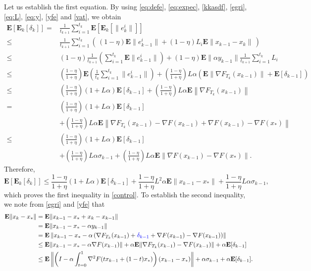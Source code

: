 \documentclass[11pt]{article}
\newcommand{\E}{\mathbf{E}}
\begin{document}
Let us establish the first equation.
By using \eqref{eq:defe}, \eqref{eq:expec}, \eqref{kkasdf},  \eqref{egri}, \eqref{eq:L}, \eqref{eq:y}, \eqref{yfe} and \eqref{vat}, we obtain
\small
\begin{align*}
 \E[\E_k[\delta_k]]  = &\frac{1}{t_{k+1}}\sum_{i=1}^{t_k} \E[\E_k[\|e_k^i\|]] \\
 \leq &  \frac{1}{t_{k+1}}\sum_{i=1}^{t_k} \left(\, (1-\eta)\E\|e_{k-1}^i\| + (1-\eta)L_i \E\|x_{k-1} - x_k\| \, \right)\\
 \leq  &(1-\eta)\frac{1}{t_{k+1}}\left(\sum_{i=1}^{t_k}\E\|e_{k-1}^i\|\right) +   (1-\eta) \E\|\alpha y_{k-1}\| \frac{1}{t_{k+1}}\sum_{i=1}^{t_k}L_i\\
 \leq  &{\left(\frac{1-\eta}{1+\eta}\right)}\E\left(\frac{1}{t_k}\sum_{i=1}^{t_k}\|e_{k-1}^i\|\right) + {\left(\frac{1-\eta}{1+\eta}\right)} L \alpha\left(\E\|\nabla F_{T_k}(x_{k-1})\| + \E[\delta_{k-1}]\right) \\
 \leq  &{\left(\frac{1-\eta}{1+\eta}\right)}\left(1 + L\alpha \right)\E[\delta_{k-1}] + {\left(\frac{1-\eta}{1+\eta}\right)}L\alpha\E\left\|\nabla F_{T_k}(x_{k-1})\right\|\\
  = &{\left(\frac{1-\eta}{1+\eta}\right)}\left(1 + L\alpha \right)\E[\delta_{k-1}] \\
 &+ {\left(\frac{1-\eta}{1+\eta}\right)}L\alpha\E\left\|\nabla F_{T_k}(x_{k-1})-\nabla F(x_{k-1})+\nabla F(x_{k-1})-\nabla F(x_\ast)\right\|\\
  \leq &{\left(\frac{1-\eta}{1+\eta}\right)}\left(1 + L\alpha \right)\E[\delta_{k-1}] \\
 &+ {\left(\frac{1-\eta}{1+\eta}\right)}L\alpha\sigma_{k-1} + {\left(\frac{1-\eta}{1+\eta}\right)}L\alpha\E\|\nabla F(x_{k-1})-\nabla F(x_\ast)\| .
\end{align*}
\normalsize
Therefore,
\begin{equation}\label{eq:row1}
 \E[\E_k[\delta_k]] \leq \frac{1-\eta}{1+\eta}\left(1 + L\alpha \right)\E[\delta_{k-1}]+  \frac{1-\eta}{1+\eta}L^2\alpha\E\|x_{k-1}-x_\ast\| + \frac{1-\eta}{1+\eta}L\alpha\sigma_{k-1} ,
\end{equation}
which proves the first inequality in \eqref{control}. To establish the second inequality, we note from \eqref{egri} and \eqref{yfe} that
 \begin{align*}
   \E\|x_k-x_\ast\| &= \E\|x_{k-1}-x_\ast + x_k-x_{k-1}\|\\
   &= \E\|x_{k-1}-x_\ast -\alpha y_{k-1}\|\\
   &= \E\left\|x_{k-1}-x_\ast -\alpha \left(\nabla F_{T_k}(x_{k-1}) +{\color{blue} \delta_{k-1}} + \nabla F(x_{k-1})-\nabla F(x_{k-1})\right)\right\|\\  
%   
%   
   &\leq \E\|x_{k-1}-x_\ast -\alpha\nabla F(x_{k-1})\| + \alpha\E\|\nabla F_{T_k}(x_{k-1}) -\nabla F(x_{k-1})\| + \alpha \E[\delta_{k-1}]\\
   &\leq\E\left\|\left(I-\alpha\int_{t=0}^1 \nabla^2 F(tx_{k-1}+(1-t)x_\ast)\right)(x_{k-1}-x_\ast)\right\| + \alpha\sigma_{k-1} + \alpha \E[\delta_{k-1}]. 
 \end{align*}
\end{document}
